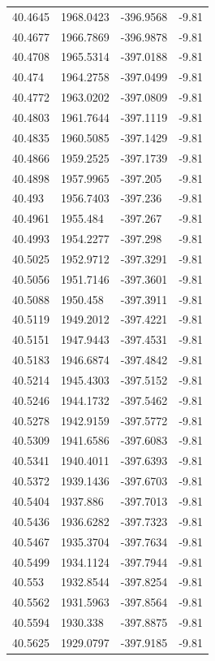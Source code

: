 \begin{table}[H]
\begin{tabular}{llll}
40.4645 & 1968.0423 & -396.9568 & -9.81 \\
40.4677 & 1966.7869 & -396.9878 & -9.81 \\
40.4708 & 1965.5314 & -397.0188 & -9.81 \\
40.474 & 1964.2758 & -397.0499 & -9.81 \\
40.4772 & 1963.0202 & -397.0809 & -9.81 \\
40.4803 & 1961.7644 & -397.1119 & -9.81 \\
40.4835 & 1960.5085 & -397.1429 & -9.81 \\
40.4866 & 1959.2525 & -397.1739 & -9.81 \\
40.4898 & 1957.9965 & -397.205 & -9.81 \\
40.493 & 1956.7403 & -397.236 & -9.81 \\
40.4961 & 1955.484 & -397.267 & -9.81 \\
40.4993 & 1954.2277 & -397.298 & -9.81 \\
40.5025 & 1952.9712 & -397.3291 & -9.81 \\
40.5056 & 1951.7146 & -397.3601 & -9.81 \\
40.5088 & 1950.458 & -397.3911 & -9.81 \\
40.5119 & 1949.2012 & -397.4221 & -9.81 \\
40.5151 & 1947.9443 & -397.4531 & -9.81 \\
40.5183 & 1946.6874 & -397.4842 & -9.81 \\
40.5214 & 1945.4303 & -397.5152 & -9.81 \\
40.5246 & 1944.1732 & -397.5462 & -9.81 \\
40.5278 & 1942.9159 & -397.5772 & -9.81 \\
40.5309 & 1941.6586 & -397.6083 & -9.81 \\
40.5341 & 1940.4011 & -397.6393 & -9.81 \\
40.5372 & 1939.1436 & -397.6703 & -9.81 \\
40.5404 & 1937.886 & -397.7013 & -9.81 \\
40.5436 & 1936.6282 & -397.7323 & -9.81 \\
40.5467 & 1935.3704 & -397.7634 & -9.81 \\
40.5499 & 1934.1124 & -397.7944 & -9.81 \\
40.553 & 1932.8544 & -397.8254 & -9.81 \\
40.5562 & 1931.5963 & -397.8564 & -9.81 \\
40.5594 & 1930.338 & -397.8875 & -9.81 \\
40.5625 & 1929.0797 & -397.9185 & -9.81 \\

\end{tabular}
\end{table}
